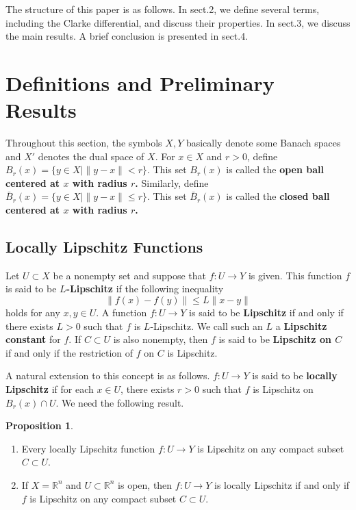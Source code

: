 \documentclass[a4paper,12pt]{article}
\theoremstyle{definition}
\newtheorem{prop}{Proposition}
\begin{document}
The structure of this paper is as follows. In sect.2, we define several terms, including the Clarke differential, and discuss their properties. In sect.3, we discuss the main results. A brief conclusion is presented in sect.4.




\section{Definitions and Preliminary Results}
Throughout this section, the symbols $X,Y$ basically denote some Banach spaces and $X'$ denotes the dual space of $X$. For $x\in X$ and $r>0$, define $B_r(x)=\{y\in X|\|y-x\|<r\}$. This set $B_r(x)$ is called the {\bf open ball centered at $x$ with radius $r$.} Similarly, define $\bar{B}_r(x)=\{y\in X|\|y-x\|\le r\}$. This set $\bar{B}_r(x)$ is called the {\bf closed ball centered at $x$ with radius $r$.}

\subsection{Locally Lipschitz Functions}
Let $U\subset X$ be a nonempty set and suppose that $f:U\to Y$ is given. This function $f$ is said to be {\bf $L$-Lipschitz} if the following inequality
\begin{equation}\label{L}
\|f(x)-f(y)\|\le L\|x-y\|
\end{equation}
holds for any $x,y\in U$. A function $f:U\to Y$ is said to be {\bf Lipschitz} if and only if there exists $L>0$ such that $f$ is $L$-Lipschitz. We call such an $L$ a {\bf Lipschitz constant} for $f$. If $C\subset U$ is also nonempty, then $f$ is said to be {\bf Lipschitz on $C$} if and only if the restriction of $f$ on $C$ is Lipschitz.

A natural extension to this concept is as follows. $f:U\to Y$ is said to be {\bf locally Lipschitz} if for each $x\in U$, there exists $r>0$ such that $f$ is Lipschitz on $B_r(x)\cap U$. We need the following result.

\begin{prop}\label{prop1}
\begin{enumerate}[1)]
\item Every locally Lipschitz function $f:U\to Y$ is Lipschitz on any compact subset $C\subset U$.

\item If $X=\mathbb{R}^n$ and $U\subset \mathbb{R}^n$ is open, then $f:U\to Y$ is locally Lipschitz if and only if $f$ is Lipschitz on any compact subset $C\subset U$.
\end{enumerate}
\end{prop}
\end{document}
